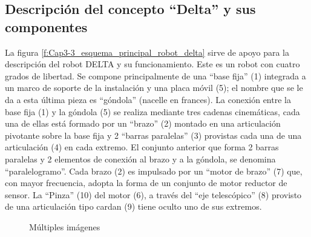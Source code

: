         \newpage
    
    \subsection{Descripción del concepto ``Delta'' y sus componentes}
    La figura \ref{f:Cap3-3_esquema_principal_robot_delta} sirve de apoyo para la descripción del robot DELTA y su funcionamiento. Este es un robot con cuatro grados de libertad. Se compone principalmente de una ``base fija'' (1) integrada a un marco de soporte de la instalación y una placa móvil (5); el nombre que se le da a esta última pieza es ``góndola'' (nacelle en frances). La conexión entre la base fija (1) y la góndola (5) se realiza mediante tres cadenas cinemáticas, cada una de ellas está formado por un ``brazo'' (2) montado en una articulación pivotante sobre la base fija y 2 ``barras paralelas'' (3) provistas cada una de una articulación (4) en cada extremo. El conjunto anterior que forma 2 barras paralelas y 2 elementos de conexión al brazo y a la góndola, se denomina ``paralelogramo''. Cada brazo (2) es impulsado por un ``motor de brazo'' (7) que, con mayor frecuencia, adopta la forma de un conjunto de motor reductor de sensor. La ``Pinza'' (10) del motor (6), a través del ``eje telescópico'' (8) provisto de una articulación tipo cardan (9) tiene oculto uno de sus extremos.

    \vspace{-1em}

    \begin{figure}[h]
         \centering
         \caption{Múltiples imágenes}
    \end{figure}


